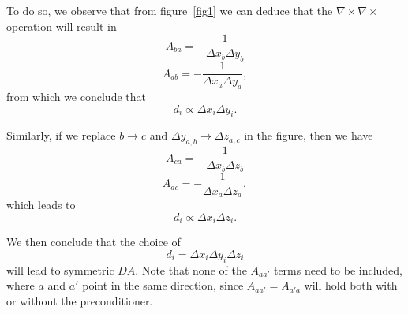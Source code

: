 \documentclass{article}
\newcommand{\BE}{\begin{equation}}
\newcommand{\EE}{\end{equation}}
\newcommand{\D}{\Delta}
\begin{document}
To do so, we observe that from figure~\ref{fig1} we can deduce that the
    $\nabla \times \nabla \times$ operation will result in
    \BE A_{ba} = -\frac{1}{\D x_b \D y_b} \EE
    \BE A_{ab} = -\frac{1}{\D x_a \D y_a}, \EE
    from which we conclude that
    \BE d_i \propto \D x_i \D y_i. \EE

Similarly, if we replace $b \to c$ and $\D y_{a,b} \to \D z_{a,c}$ 
    in the figure, then we have
    \BE A_{ca} = -\frac{1}{\D x_b \D z_b} \EE
    \BE A_{ac} = -\frac{1}{\D x_a \D z_a}, \EE
    which leads to
    \BE d_i \propto \D x_i \D z_i. \EE

We then conclude that the choice of 
    \BE d_i = \D x_i \D y_i \D z_i \EE
    will lead to symmetric $DA$.
Note that none of the $A_{aa'}$ terms need to be included,
    where $a$ and $a'$ point in the same direction,
    since $A_{aa'} = A_{a'a}$ will hold both with or without the preconditioner.
\end{document}
